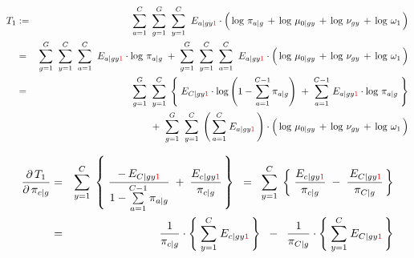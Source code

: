 \begin{eqnarray*}
T_{1}
&:=&
	\overset{C}{\underset{a=1}{\sum}}\;\;
	\overset{G}{\underset{g=1}{\sum}}\;\;
	\overset{C}{\underset{y=1}{\sum}}\;\;
	E_{a \vert gy{\color{red}1}}
	\cdot
	\left(\,
		\log\,\pi_{a \vert g}
		\,\overset{{\color{white}.}}{+}\,
		\log\,\mu_{0\vert gy}
		\,\overset{{\color{white}.}}{+}\,
		\log\,\nu_{gy}
		\,\overset{{\color{white}.}}{+}\,
		\log\,\omega_{1}
	\,\right)
\\
&=&
	\overset{G}{\underset{g=1}{\sum}}\;\;
	\overset{C}{\underset{y=1}{\sum}}\;\;
	\overset{C}{\underset{a=1}{\sum}}\;\;
	E_{a \vert gy{\color{red}1}} \cdot \log\,\pi_{a \vert g}
	\; + \;
	\overset{G}{\underset{g=1}{\sum}}\;\;
	\overset{C}{\underset{y=1}{\sum}}\;\;
	\overset{C}{\underset{a=1}{\sum}}\;\;
	E_{a \vert gy{\color{red}1}}
	\cdot
	\left(\,
		\log\,\mu_{0\vert gy}
		\,\overset{{\color{white}.}}{+}\,
		\log\,\nu_{gy}
		\,\overset{{\color{white}.}}{+}\,
		\log\,\omega_{1}
	\,\right)
\\
&=&
	{\color{white}+} \;\;
	\overset{G}{\underset{g=1}{\sum}}\;\;
	\overset{C}{\underset{y=1}{\sum}}\;
	\left\{\;
		E_{C \vert gy{\color{red}1}} \cdot \log\left(1 - \overset{C-1}{\underset{a=1}{\sum}}\,\pi_{a \vert g}\right)
		\; + \;
		\overset{C-1}{\underset{a=1}{\sum}}\;
		E_{a \vert gy{\color{red}1}} \cdot \log\,\pi_{a \vert g}
	\;\right\}
\\
&&
	+ \;\;
	\overset{G}{\underset{g=1}{\sum}}\;\;
	\overset{C}{\underset{y=1}{\sum}}\;
	\left(\,\overset{C}{\underset{a=1}{\sum}}\; E_{a \vert gy{\color{red}1}}\,\right)
	\cdot
	\left(\,
		\log\,\mu_{0\vert gy}
		\,\overset{{\color{white}.}}{+}\,
		\log\,\nu_{gy}
		\,\overset{{\color{white}.}}{+}\,
		\log\,\omega_{1}
	\,\right)
\end{eqnarray*}

\begin{eqnarray*}
\dfrac{\partial\,T_{1}}{\partial\,\pi_{c \vert g}}
&=&
	\overset{C}{\underset{y=1}{\sum}}\;
	\left\{\;
		\dfrac{-\,E_{C \vert gy{\color{red}1}}}{1 - \overset{C-1}{\underset{a=1}{\sum}}\,\pi_{a \vert g}}
		\; + \;
		\dfrac{E_{c \vert gy{\color{red}1}}}{\pi_{c \vert g}}
	\,\right\}
	\;\; = \;\;
	\overset{C}{\underset{y=1}{\sum}}\;
	\left\{\;
		\dfrac{E_{c \vert gy{\color{red}1}}}{\pi_{c \vert g}}
		\; - \;
		\dfrac{\,E_{C \vert gy{\color{red}1}}}{\pi_{C \vert g}}
	\,\right\}
\\
&=&
	\dfrac{1}{\pi_{c \vert g}}
	\cdot
	\left\{\;
		\overset{C}{\underset{y=1}{\sum}}\;
		E_{c \vert gy{\color{red}1}}
	\,\right\}
	\;\; - \;\;
	\dfrac{1}{\pi_{C \vert g}}
	\cdot
	\left\{\;
		\overset{C}{\underset{y=1}{\sum}}\;
		E_{C \vert gy{\color{red}1}}
	\,\right\}
\end{eqnarray*}

